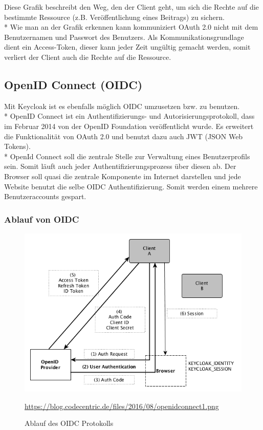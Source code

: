 Diese Grafik beschreibt den Weg, den der Client geht, um sich die Rechte auf die bestimmte Ressource (z.B. Veröffentlichung eines Beitrags) zu sichern. \\*
Wie man an der Grafik erkennen kann kommuniziert OAuth 2.0 nicht mit dem Benutzernamen und Passwort des Benutzers. 
Als Kommunikationsgrundlage dient ein Access-Token, dieser kann jeder Zeit ungültig gemacht werden, somit verliert der Client auch die Rechte auf die Ressource. \cite{KeycloakCodeCentric}

\subsection{OpenID Connect (OIDC)}
Mit Keycloak ist es ebenfalls möglich OIDC umzusetzen bzw. zu benutzen. \\*
OpenID Connect ist ein Authentifizierungs- und Autorisierungsprotokoll, dass im Februar 2014 von der OpenID Foundation veröffentlicht wurde.
Es erweitert die Funktionalität von OAuth 2.0 und benutzt dazu auch JWT (JSON Web Tokens). \\*
OpenId Connect soll die zentrale Stelle zur Verwaltung eines Benutzerprofils sein. Somit läuft auch jeder Authentifizierungsprozess über diesen ab.
Der Browser soll quasi die zentrale Komponente im Internet darstellen und jede Website benutzt die selbe OIDC Authentifizierung. Somit werden einem mehrere Benutzeraccounts gespart. \cite{KeycloakCodeCentric}
\pagebreak

\subsubsection{Ablauf von OIDC}
\begin{figure}[htp]
    \centering
    \includegraphics[scale=0.6]{pics/Ablauf_OIDC.png}
    \caption{Ablauf des OIDC Protokolls}
    \small \url{https://blog.codecentric.de/files/2016/08/openidconnect1.png} 
    \label{fig:impl:OIDCProtocoll}
\end{figure}

